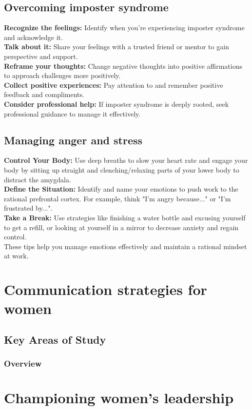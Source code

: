 \documentclass[12pt]{article}
\begin{document}
\subsection{Overcoming imposter syndrome}
\textbf{Recognize the feelings:} Identify when you're experiencing imposter syndrome and acknowledge it.\\
\textbf{Talk about it:} Share your feelings with a trusted friend or mentor to gain perspective and support.\\
\textbf{Reframe your thoughts:} Change negative thoughts into positive affirmations to approach challenges more positively.\\
\textbf{Collect positive experiences:}  Pay attention to and remember positive feedback and compliments.\\
\textbf{Consider professional help:}  If imposter syndrome is deeply rooted, seek professional guidance to manage it effectively.\\

\subsection{Managing anger and stress}
\textbf{Control Your Body:}  Use deep breaths to slow your heart rate and engage your body by sitting up straight and clenching/relaxing parts of your lower body to distract the amygdala.\\
\textbf{Define the Situation:}  Identify and name your emotions to push work to the rational prefrontal cortex. For example, think "I'm angry because..." or "I'm frustrated by...".\\
\textbf{Take a Break:} Use strategies like finishing a water bottle and excusing yourself to get a refill, or looking at yourself in a mirror to decrease anxiety and regain control.\\

These tips help you manage emotions effectively and maintain a rational mindset at work.\\


\section{ Communication strategies for women}

\subsection{Key Areas of Study}

\subsubsection{Overview}

\section{Championing women's leadership}



\end{document}
